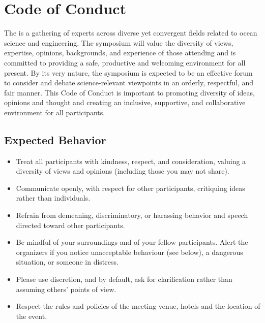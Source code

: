 \section{Code of Conduct}

The \symp is a gathering of experts across diverse yet convergent
fields related to ocean science and engineering. The symposium will
value the diversity of views, expertise, opinions, backgrounds, and
experience of those attending and is committed to providing a safe,
productive and welcoming environment for all present. By its very
nature, the symposium is expected to be an effective forum to consider
and debate science-relevant viewpoints in an orderly, respectful, and
fair manner. This Code of Conduct is important to promoting diversity
of ideas, opinions and thought and creating an inclusive, supportive,
and collaborative environment for all participants.

\subsection{Expected Behavior}

\begin{itemize}[noitemsep,topsep=0pt,parsep=0pt,partopsep=0pt]

\item Treat all participants with kindness, respect, and consideration,
  valuing a diversity of views and opinions (including those you may not
  share).

\item Communicate openly, with respect for other participants,
  critiquing ideas rather than individuals.

\item Refrain from demeaning, discriminatory, or harassing behavior and
  speech directed toward other participants. 

\item Be mindful of your surroundings and of your fellow
  participants. Alert the organizers if you notice unacceptable
  behaviour (see below), a dangerous situation, or someone in distress.  

\item Please use discretion, and by default, ask for clarification
  rather than assuming others’ points of view.

\item Respect the rules and policies of the meeting venue, hotels and
  the location of the event.

\end{itemize}

